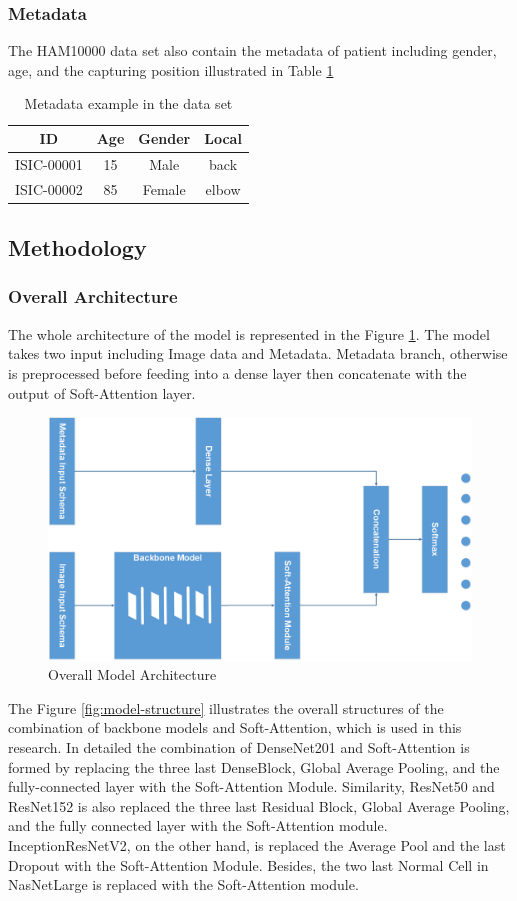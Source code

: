 \documentclass[sensors,article,submit,pdftex,moreauthors]{Definitions/mdpi}
\begin{document}
\subsubsection{Metadata}
The HAM10000 data set \cite{10417} also contain the metadata of patient including gender, age, and the capturing position illustrated in Table \ref{table:metadata sample}
\begin{table}[H]
	\centering
	\begin{tabular}{|c c c c |} 
		\hline
		ID & Age & Gender & Local\\ 
		\hline
		ISIC-00001 & 15 & Male & back\\
		\hline
		ISIC-00002 & 85 & Female & elbow\\
		\hline
	\end{tabular}
	\caption{Metadata example in the data set}
	\label{table:metadata sample}
\end{table}
\subsection{Methodology}
\subsubsection{Overall Architecture}
The whole architecture of the model is represented in the Figure \ref{fig:main-model}. The model takes two input including Image data and Metadata. Metadata branch, otherwise is preprocessed before feeding into a dense layer then concatenate with the output of Soft-Attention layer. 

\begin{figure}[H]
	\centering
	\includegraphics[width=0.8\linewidth]{Definitions/MainModel - Model Form}
	\caption{Overall Model Architecture}
	\label{fig:main-model}
\end{figure}

The Figure \ref{fig:model-structure} illustrates the overall structures of the combination of backbone models and Soft-Attention, which is used in this research. In detailed the combination of DenseNet201 and Soft-Attention is formed by replacing the three last DenseBlock, Global Average Pooling, and the fully-connected layer with the Soft-Attention Module. Similarity, ResNet50 and ResNet152 is also replaced the three last Residual Block, Global Average Pooling, and the fully connected layer with the Soft-Attention module. InceptionResNetV2, on the other hand, is replaced the Average Pool and the last Dropout with the Soft-Attention Module. Besides, the two last Normal Cell in NasNetLarge is replaced with the Soft-Attention module. 
\end{document}
